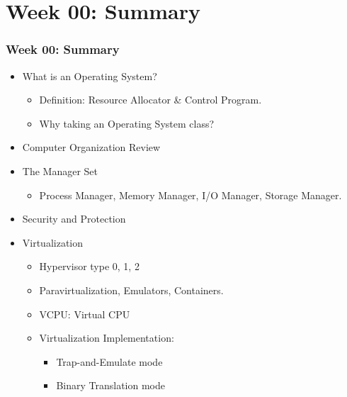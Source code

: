 \documentclass[xcolor=table, notheorems, hyperref={pdfpagelabels=false}]{beamer}
\begin{document}













\section{Week 00: Summary}
\begin{frame}
\frametitle{Week 00: Summary}
\begin{itemize}
\item What is an Operating System?
\begin{itemize}
\item Definition: Resource Allocator \& Control Program.
\item Why taking an Operating System class?
\end{itemize}
\item Computer Organization Review
\item The Manager Set
\begin{itemize}
\item Process Manager, Memory Manager, I/O Manager, Storage Manager.
\end{itemize}
\item Security and Protection
\item Virtualization
\begin{itemize}
\item Hypervisor type 0, 1, 2
\item Paravirtualization, Emulators, Containers.
\item VCPU: Virtual CPU
\item Virtualization Implementation:
\begin{itemize}
\item Trap-and-Emulate mode
\item Binary Translation mode
\end{itemize}
\end{itemize}
\end{itemize}
\end{frame}




\end{document}

